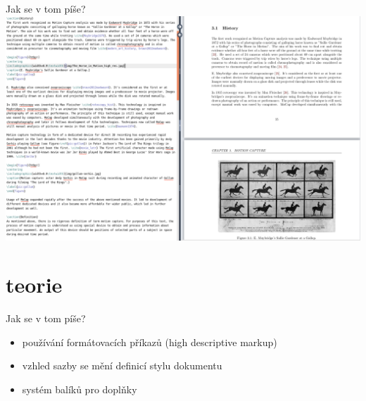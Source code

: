 \documentclass{beamer}
\begin{document}
\begin{frame}{Jak se v tom píše?}
\includegraphics[width=2\textwidth]{latex.png}
\end{frame}
\section{teorie}
\begin{frame}{Jak se v tom píše?}
\begin{itemize}
    \item používání formátovacích příkazů (high descriptive markup)
    \item vzhled sazby se mění definicí stylu dokumentu 
    \item systém balíků pro doplňky
\end{itemize}
\end{frame}
\end{document}
